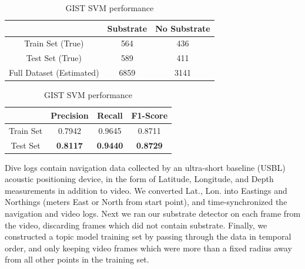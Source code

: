 \begin{table}[t]
    \begin{center}
      \begin{tabular}{|c|cc|}
      \hline
         & Substrate & No Substrate \\
        \hline\hline
        Train Set (True)         & 564  & 436 \\
        Test Set (True)          & 589  & 411 \\
        Full Dataset (Estimated) & 6859 & 3141\\
        \hline
      \end{tabular}
      \caption{Numbers of relevant and irrelevant frames in our example video.}
      \label{tab:detection-statistics}
    \end{center}

    \begin{center}
      \begin{tabular}{|c|ccc|}
        \hline
         & Precision & Recall & F1-Score\\
        \hline\hline
        Train Set & 0.7942 & 0.9645 & 0.8711\\
        Test Set  & \textbf{0.8117} & \textbf{0.9440} & \textbf{0.8729}\\
        \hline
      \end{tabular}
      \caption{Performance of GIST SVM substrate detector.}
      \label{tab:GIST-svm-performance} 
    \end{center}
  \caption{GIST SVM performance}   
\end{table}

Dive logs contain navigation data collected by an ultra-short baseline (USBL) acoustic positioning device, in the form of Latitude, Longitude, and Depth measurements in addition to video. We converted Lat., Lon. into Eastings and Northings (meters East or North from start point), and time-synchronized the navigation and video logs. Next we ran our substrate detector on each frame from the video, discarding frames which did not contain substrate. Finally, we constructed a topic model training set by passing through the data in temporal order, and only keeping video frames which were more than a fixed radius away from all other points in the training set.

